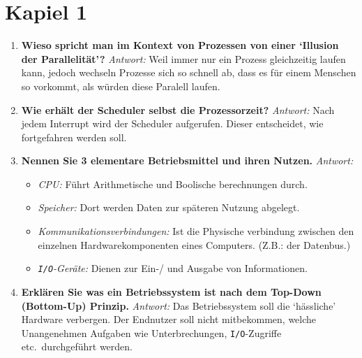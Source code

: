 \chapter{Kapiel 1}

\begin{enumerate}[label=\arabic*.]
    \item \textbf{Wieso spricht man im Kontext von Prozessen von einer `Illusion der Parallelität'?} \newline
          \textit{Antwort:} Weil immer nur ein Prozess gleichzeitig laufen kann, jedoch wechseln Prozesse sich
          so schnell ab, dass es für einem Menschen so vorkommt, als würden diese Paralell laufen.

    \item \textbf{Wie erhält der Scheduler selbst die Prozessorzeit?} \newline
          \textit{Antwort:} Nach jedem Interrupt wird der Scheduler aufgerufen. Dieser entscheidet, wie fortgefahren
          werden soll.

    \item \textbf{Nennen Sie 3 elementare Betriebsmittel und ihren Nutzen.} \newline
          \textit{Antwort:} \begin{itemize}
              \item \textit{CPU:} Führt Arithmetische und Boolische berechnungen durch.
              \item \textit{Speicher:} Dort werden Daten zur späteren Nutzung abgelegt.
              \item \textit{Kommunikationsverbindungen:} Ist die Physische verbindung zwischen den einzelnen
                    Hardwarekomponenten eines Computers. \newline (Z.B.: der Datenbus.)
              \item \textit{\texttt{I/O}-Geräte:} Dienen zur Ein-/ und Ausgabe von Informationen.
          \end{itemize}

    \item \textbf{Erklären Sie was ein Betriebssystem ist nach dem Top-Down (Bottom-Up) Prinzip.} \newline
          \textit{Antwort:} Das Betriebssystem soll die `hässliche' Hardware verbergen. Der Endnutzer soll nicht
          mitbekommen, welche Unangenehmen Aufgaben wie Unterbrechungen, \texttt{I/O}-Zugriffe
          etc.\ durchgeführt werden.


\end{enumerate}
